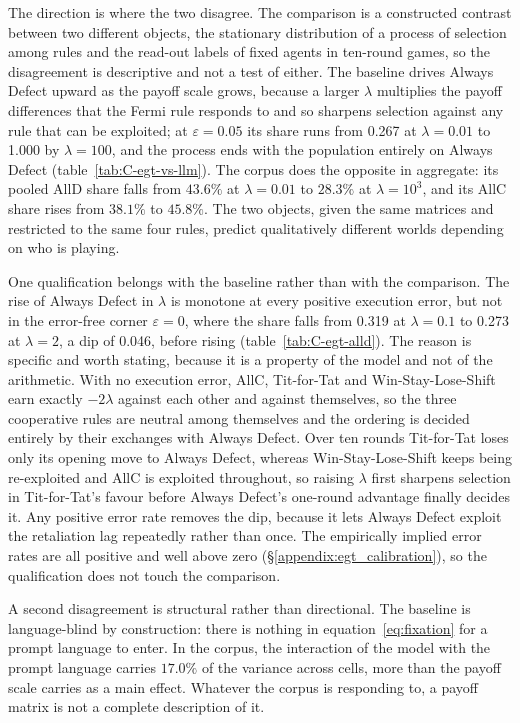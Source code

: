 \documentclass[openacc]{rsproca_new}
\newcommand{\lam}{\lambda}
\newcommand{\rev}[1]{{\color{red}#1}}
\newcommand{\rev}[1]{#1}
\begin{document}
\rev{The direction is where the two disagree. The comparison is a constructed
contrast between two different objects, the stationary distribution of a
process of selection among rules and the read-out labels of fixed agents in
ten-round games, so the disagreement is descriptive and not a test of either.}
The baseline drives Always Defect upward as the payoff scale grows, because a
larger $\lam$ multiplies the payoff differences that the Fermi rule responds to
and so sharpens selection against any rule that can be exploited; at
$\varepsilon = 0.05$ its share runs from 0.267 at $\lam = 0.01$ to 1.000 by
$\lam = 100$, and the process ends with the population entirely on Always
Defect (table~\ref{tab:C-egt-vs-llm}). The corpus does the opposite in
aggregate: its pooled AllD share falls from $43.6\%$ at $\lam = 0.01$ to
$28.3\%$ at $\lam = 10^{3}$, and its AllC share rises from $38.1\%$ to
$45.8\%$. The two objects, given the same matrices and restricted to the same
four rules, predict qualitatively different worlds depending on who is playing.

One qualification belongs with the baseline rather than with the comparison.
The rise of Always Defect in $\lam$ is monotone at every positive execution
error, but not in the error-free corner $\varepsilon = 0$, where the share falls
from 0.319 at $\lam = 0.1$ to 0.273 at $\lam = 2$, a dip of 0.046, before rising
(table~\ref{tab:C-egt-alld}). The reason is
specific and worth stating, because it is a property of the model and not of
the arithmetic. With no execution error, AllC, Tit-for-Tat and
Win-Stay-Lose-Shift earn exactly $-2\lam$ against each other and against
themselves, so the three cooperative rules are neutral among themselves and the
ordering is decided entirely by their exchanges with Always Defect. Over ten
rounds Tit-for-Tat loses only its opening move to Always Defect, whereas
Win-Stay-Lose-Shift keeps being re-exploited and AllC is exploited throughout,
so raising $\lam$ first sharpens selection in Tit-for-Tat's favour before
Always Defect's one-round advantage finally decides it. Any positive error rate
removes the dip, because it lets Always Defect exploit the retaliation lag
repeatedly rather than once. The empirically implied error rates are all
positive and well above zero (\S\ref{appendix:egt_calibration}), so the
qualification does not touch the comparison.

A second disagreement is structural rather than directional. The baseline is
language-blind by construction: there is nothing in equation~\eqref{eq:fixation}
for a prompt language to enter. In the corpus, the interaction of the model
with the prompt language carries $17.0\%$ of the variance across cells, more
than the payoff scale carries as a main effect. Whatever the corpus is
responding to, a payoff matrix is not a complete description of it.
\end{document}
